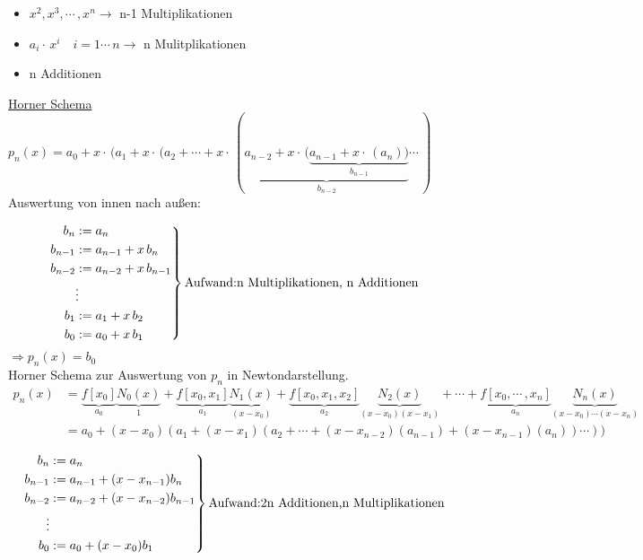 \begin{itemize}
	\item $x^2, x^3,\cdots\,,x^n \rightarrow$ n-1 Multiplikationen
	\item $a_i\cdot\,x^i \quad i = 1\cdots\,n \rightarrow$ n Mulitplikationen
	\item n Additionen
\end{itemize}

\underline{Horner Schema}
$p_n(x) = a_0 + x\cdot\,(a_1 + x\cdot\,(a_2 + \cdots + x\cdot\,(\underbrace{a_{n-2} + x\cdot\,(\underbrace{a_{n-1} + x\cdot\,(a_n))}_{b_{n-1}}}_{b_{n-2}}\cdots\,)$
Auswertung von innen nach außen:

\begin{equation*}
\left.
\begin{aligned}
 b_n &:= a_n \\
 b_{n-1} &:= a_{n-1} + x\,b_n \\
 b_{n-2} &:= a_{n-2} + x\,b_{n-1} \\
 & \vdots \\
 b_{1} &:= a_{1} + x\,b_{2} \\
 b_{0} &:= a_{0} + x\,b_{1} 
\end{aligned}
\right\}
\text{Aufwand:} \\
\text{n Multiplikationen, n Additionen}
\end{equation*}
$\Rightarrow p_n(x) = b_0$\\

Horner Schema zur Auswertung von $p_n$ in Newtondarstellung.\\
\begin{align*}
 p_n(x) &= \underbrace{f[x_0]}_{a_0}\underbrace{N_0(x)}_{1} + \underbrace{f[x_0,x_1]}_{a_1}\underbrace{N_1(x)}_{(x-x_0)}
+ \underbrace{f[x_0,x_1,x_2]}_{a_2}\underbrace{N_2(x)}_{(x-x_0)(x-x_1)} + \cdots + \underbrace{f[x_0,\cdots\,,x_n]}_{a_n}\underbrace{N_n(x)}_{(x-x_0)\cdots(x-x_n)} \\
 &= a_0 + (x-x_0)(a_1 + (x-x_1)(a_2+ \cdots + (x-x_{n-2})(a_{n-1})+(x-x_{n-1})(a_n))\cdots)) \\
\end{align*}
\begin{equation*}
\left.
\begin{aligned}
 b_n &:= a_n \\
 b_{n-1} &:= a_{n-1} + (x-x_{n-1})b_n \\
 b_{n-2} &:= a_{n-2} + (x-x_{n-2})b_{n-1} \\
 \vdots \\
 b_0 &:= a_0 + (x-x_0)b_1
\end{aligned}
\right\}
\text{Aufwand: \\
2n Additionen, \\
n Multiplikationen}
\end{equation*}